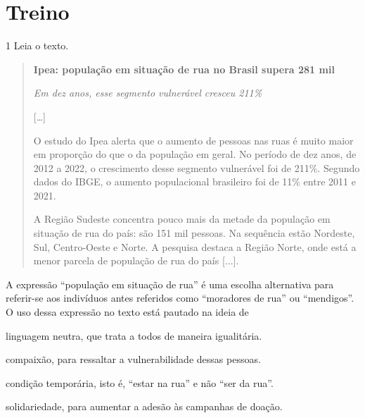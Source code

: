 
\section{Treino}

\num{1} Leia o texto.

\begin{quote}
\centering\textbf{Ipea: população em situação de rua no Brasil supera 281 mil}

\centering\emph{Em dez anos, esse segmento vulnerável cresceu 211\%}

{[}\ldots{]}

O estudo do Ipea alerta que o aumento de pessoas nas ruas é muito maior
em proporção do que o da população em geral. No período de dez anos, de
2012 a 2022, o crescimento desse segmento vulnerável foi de 211\%.
Segundo dados do IBGE, o aumento populacional brasileiro foi de 11\%
entre 2011 e 2021.

A Região Sudeste concentra pouco mais da metade da população em situação
de rua do país: são 151 mil pessoas. Na sequência estão Nordeste, Sul,
Centro-Oeste e Norte. A pesquisa destaca a Região Norte, onde está a
menor parcela de população de rua do país {[}...{]}.

\end{quote}

A expressão ``população em situação de rua'' é uma escolha alternativa
para referir-se aos indivíduos antes referidos como ``moradores de rua''
ou ``mendigos''. O uso dessa expressão no texto está pautado na ideia de

\begin{escolha}

\item linguagem neutra, que trata a todos de maneira igualitária.

\item compaixão, para ressaltar a vulnerabilidade dessas pessoas.

\item condição temporária, isto é, ``estar na rua'' e não ``ser da rua''.

\item solidariedade, para aumentar a adesão às campanhas de doação.

\end{escolha}

